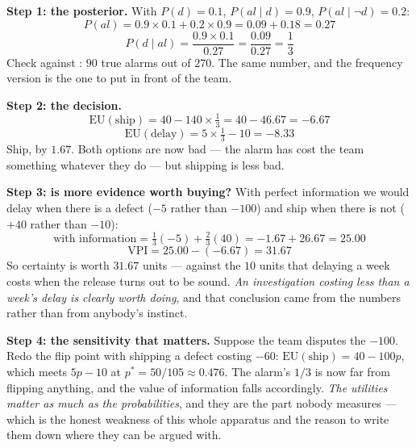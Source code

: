 \begin{worked}
\textbf{Step 1: the posterior.} With $P(d) = 0.1$,
$P(\mathit{al} \mid d) = 0.9$, $P(\mathit{al} \mid \neg d) = 0.2$:
\[
  P(\mathit{al}) = 0.9 \times 0.1 + 0.2 \times 0.9 = 0.09 + 0.18 = 0.27
\]
\[
  P(d \mid \mathit{al}) = \frac{0.9 \times 0.1}{0.27}
  = \frac{0.09}{0.27} = \frac{1}{3}
\]
Check against : $90$ true alarms out of $270$. The same number,
and the frequency version is the one to put in front of the team.

\smallskip
\textbf{Step 2: the decision.}
\[
  \mathrm{EU}(\text{ship}) = 40 - 140 \times \tfrac{1}{3}
  = 40 - 46.67 = -6.67
\]
\[
  \mathrm{EU}(\text{delay}) = 5 \times \tfrac{1}{3} - 10 = -8.33
\]
Ship, by $1.67$. Both options are now bad --- the alarm has cost the team something
whatever they do --- but shipping is less bad.

\smallskip
\textbf{Step 3: is more evidence worth buying?} With perfect information we would
delay when there is a defect ($-5$ rather than $-100$) and ship when there is not
($+40$ rather than $-10$):
\[
  \text{with information} = \tfrac{1}{3}(-5) + \tfrac{2}{3}(40)
  = -1.67 + 26.67 = 25.00
\]
\[
  \mathrm{VPI} = 25.00 - (-6.67) = 31.67
\]
So certainty is worth $31.67$ units --- against the $10$ units that delaying a week
costs when the release turns out to be sound. \emph{An investigation costing less
than a week's delay is clearly worth doing}, and that conclusion came from the
numbers rather than from anybody's instinct.

\smallskip
\textbf{Step 4: the sensitivity that matters.} Suppose the team disputes the
$-100$. Redo the flip point with shipping a defect costing $-60$:
$\mathrm{EU}(\text{ship}) = 40 - 100p$, which meets $5p - 10$ at
$p^{*} = 50/105 \approx 0.476$. The alarm's $1/3$ is now far from flipping
anything, and the value of information falls accordingly. \emph{The utilities
matter as much as the probabilities}, and they are the part nobody measures ---
which is the honest weakness of this whole apparatus and the reason to write them
down where they can be argued with.
\end{worked}

